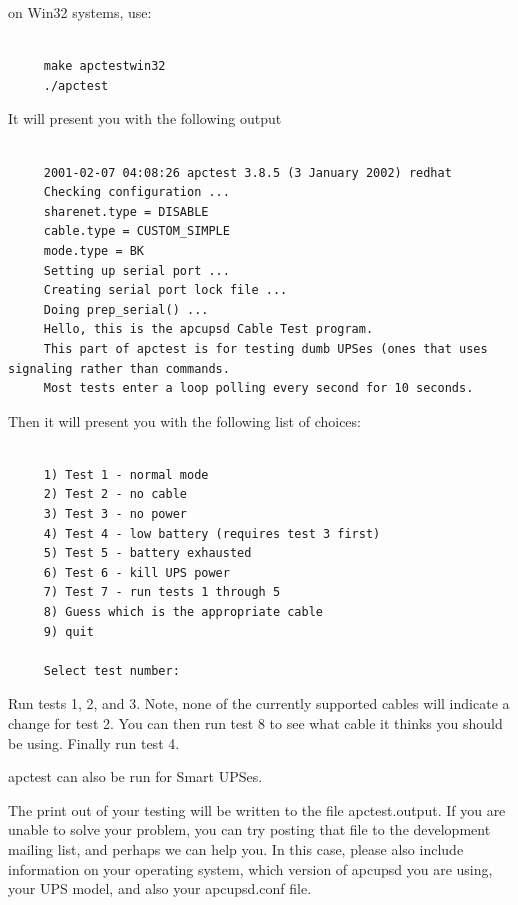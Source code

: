 on Win32 systems, use: 

\footnotesize
\begin{verbatim}
     
     make apctestwin32
     ./apctest
\end{verbatim}
\normalsize

It will present you with the following output 

\footnotesize
\begin{verbatim}
     
     2001-02-07 04:08:26 apctest 3.8.5 (3 January 2002) redhat
     Checking configuration ...
     sharenet.type = DISABLE
     cable.type = CUSTOM_SIMPLE
     mode.type = BK
     Setting up serial port ...
     Creating serial port lock file ...
     Doing prep_serial() ...
     Hello, this is the apcupsd Cable Test program.
     This part of apctest is for testing dumb UPSes (ones that uses signaling rather than commands.
     Most tests enter a loop polling every second for 10 seconds.
\end{verbatim}
\normalsize

Then it will present you with the following list of choices: 

\footnotesize
\begin{verbatim}
     
     1) Test 1 - normal mode
     2) Test 2 - no cable
     3) Test 3 - no power
     4) Test 4 - low battery (requires test 3 first)
     5) Test 5 - battery exhausted
     6) Test 6 - kill UPS power
     7) Test 7 - run tests 1 through 5
     8) Guess which is the appropriate cable
     9) quit
     
     Select test number:
\end{verbatim}
\normalsize

Run tests 1, 2, and 3. Note, none of the currently supported cables will
indicate a change for test 2. You can then run test 8 to see what cable it
thinks you should be using. Finally run test 4.  

apctest can also be run for Smart UPSes.  

The print out of your testing will be written to the file apctest.output. If
you are unable to solve your problem, you can try posting that file to the
development mailing list, and perhaps we can help you. In this case, please
also include information on your operating system, which version of apcupsd
you are using, your UPS model, and also your apcupsd.conf file. 

\label{Expected-apctest-Signals-for-a-UPS}

